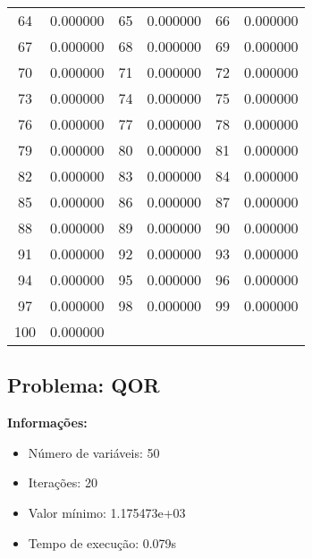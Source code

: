\documentclass[12pt]{article}
\begin{document}
\begin{longtable}{@{}cc|cc|cc@{}}
64 & 0.000000 & 65 & 0.000000 & 66 & 0.000000 \\
67 & 0.000000 & 68 & 0.000000 & 69 & 0.000000 \\
70 & 0.000000 & 71 & 0.000000 & 72 & 0.000000 \\
73 & 0.000000 & 74 & 0.000000 & 75 & 0.000000 \\
76 & 0.000000 & 77 & 0.000000 & 78 & 0.000000 \\
79 & 0.000000 & 80 & 0.000000 & 81 & 0.000000 \\
82 & 0.000000 & 83 & 0.000000 & 84 & 0.000000 \\
85 & 0.000000 & 86 & 0.000000 & 87 & 0.000000 \\
88 & 0.000000 & 89 & 0.000000 & 90 & 0.000000 \\
91 & 0.000000 & 92 & 0.000000 & 93 & 0.000000 \\
94 & 0.000000 & 95 & 0.000000 & 96 & 0.000000 \\
97 & 0.000000 & 98 & 0.000000 & 99 & 0.000000 \\
100 & 0.000000 &  &  &  &  \\

\end{longtable}


\newpage            
\subsection{Problema: QOR}

\textbf{Informações:}
\begin{itemize}
\item Número de variáveis: 50
\item Iterações: 20
\item Valor mínimo: 1.175473e+03
\item Tempo de execução: 0.079s
\end{itemize}
\end{document}
